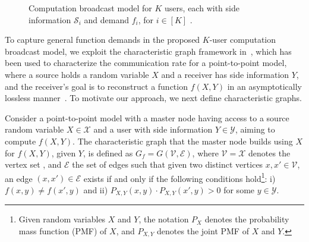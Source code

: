 \documentclass[conference, letterpaper]{IEEEtran} %
\begin{document}
\begin{figure}[t!]
\centering

\caption{Computation broadcast model for $K$ users, each with side information $\mathcal{S}_i$ and demand $f_i$, for $i\in [K]$ \cite{sun2019capacity}.}
\label{fig:CBNs}
\end{figure}


To capture general function demands in the proposed $K$-user computation broadcast model, we exploit the characteristic graph framework in~\cite{korner1973coding}, which has been used to characterize the communication rate for a point-to-point model, where a source holds a random variable $X$ and a receiver has side information $Y$, and the receiver's goal is to reconstruct a function $f(X, Y)$ in an asymptotically lossless manner~\cite{OrlRoc2001}. To motivate our approach, we next define characteristic graphs.

 
\begin{defi}
\label{def-char-graph}
 Consider a point-to-point %
 model with a master node having access to a %
 source random variable $X\in\mathcal{X}$ and a user with side information %
 $Y\in\mathcal{Y}$, aiming to compute $f(X, Y)$. The characteristic graph that the master node builds using $X$ for $f(X, Y)$, given %
 $Y$, is defined as $G_f=G(\mathcal{V}, \mathcal{E})$, where  $\mathcal{V}=\mathcal{X}$ denotes the vertex set%
 , and $\mathcal{E}$ the set of edges such that given two distinct vertices $x, x' \in \mathcal{V}$, an edge $(x, x') \in \mathcal{E}$ exists if and only if the following conditions hold\footnote{Given random variables 
 $X$ and $Y$, the notation $P_{X}$ denotes the probability mass function (PMF) of $X$, and $P_{X, Y}$ denotes the joint PMF of $X$ and $Y$.}: i) $f(x,y) \neq f(x',y)$ and ii) $P_{X, Y}(x,y)\cdot P_{X, Y}(x',y)>0$ for some $y\in \mathcal{Y}$. 
\end{defi}
\end{document}
